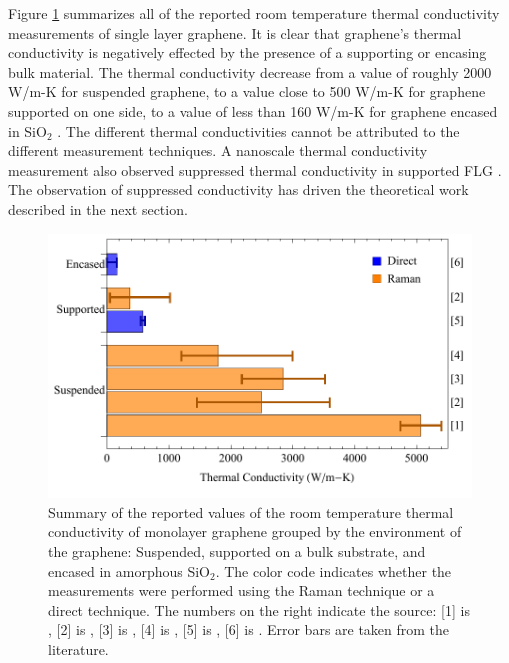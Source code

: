 Figure \ref{fig:therm:lit} summarizes all of the reported room temperature thermal conductivity measurements of single layer graphene.
It is clear that graphene's thermal conductivity is negatively effected by the presence of a supporting or encasing bulk material.
The thermal conductivity decrease from a value of roughly 2000 W/m-K for suspended graphene, to a value close to 500 W/m-K for graphene supported on one side, to a value of less than 160 W/m-K for graphene encased in SiO$_2$ \cite{Jang2010}.
The different thermal conductivities cannot be attributed to the different measurement techniques.
A nanoscale thermal conductivity measurement also observed suppressed thermal conductivity in supported FLG \cite{Pumarol2012}.
The observation of suppressed conductivity has driven the theoretical work described in the next section.

\begin{figure}
	\begin{center}
	\includegraphics{Figs_Thermal/Thermal_lit.pdf}
	\end{center}
	\caption[Environmental dependence of graphene's thermal conductivity]{
	\label{fig:therm:lit}
		Summary of the reported values of the room temperature thermal conductivity of monolayer graphene grouped by the environment of the graphene: Suspended, supported on a bulk substrate, and encased in amorphous SiO$_2$.
		The color code indicates whether the measurements were performed using the Raman technique or a direct technique.
		The numbers on the right indicate the source: [1] is \cite{Balandin2008}, [2] is \cite{Cai2010}, [3] is \cite{Chen2011a}, [4] is \cite{Lee2011}, [5] is \cite{Seol2010}, [6] is \cite{Jang2010}.
		Error bars are taken from the literature.
	}
\end{figure}

